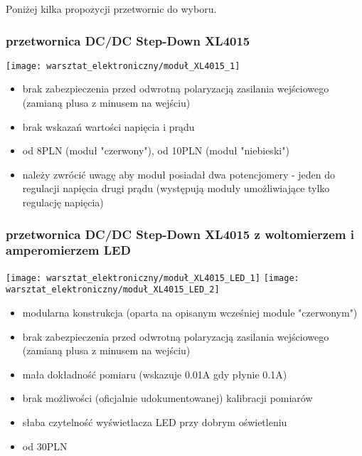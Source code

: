 \documentclass{pdfBooklets}
\newcommand\zaleta{\item[\textbf{\ttfamily +}]}
\newcommand\wada{\item[\textbf{\ttfamily -}]}
\newcommand\info{\item[\textbf{\ttfamily *}]}
\newcommand\uwaga{\item[\textbf{\ttfamily !}]}
\begin{document}
	Poniżej kilka propozycji przetwornic do wyboru.
	
	\subsubsection{przetwornica DC/DC Step-Down XL4015}
		\begin{center}
			\texttt{[image: warsztat\_elektroniczny/moduł\_XL4015\_1]}
		\end{center}
		\begin{itemize}
			\wada brak zabezpieczenia przed odwrotną polaryzacją zasilania wejściowego (zamianą plusa z minusem na wejściu)
			\wada brak wskazań wartości napięcia i prądu
			\info od 8PLN (moduł "czerwony"), od 10PLN (moduł "niebieski")
			\uwaga należy zwrócić uwagę aby moduł posiadał dwa potencjomery - jeden do regulacji napięcia drugi prądu (występują moduły umożliwiające tylko regulację napięcia)
		\end{itemize}
	
	\subsubsection{przetwornica DC/DC Step-Down XL4015 z woltomierzem i amperomierzem LED}
		\begin{center}
			\texttt{[image: warsztat\_elektroniczny/moduł\_XL4015\_LED\_1]}
			\hspace{0.5cm}
			\texttt{[image: warsztat\_elektroniczny/moduł\_XL4015\_LED\_2]}
		\end{center}
	
		\begin{itemize}
			\zaleta modularna konstrukcja (oparta na opisanym wcześniej module "czerwonym")
			\wada brak zabezpieczenia przed odwrotną polaryzacją zasilania wejściowego (zamianą plusa z minusem na wejściu)
			\wada mała dokładność pomiaru (wskazuje 0.01A gdy płynie 0.1A)
			\wada brak możliwości (oficjalnie udokumentowanej) kalibracji pomiarów
			\wada słaba czytelność wyświetlacza LED przy dobrym oświetleniu
			\info od 30PLN
		\end{itemize}
		
\end{document}
